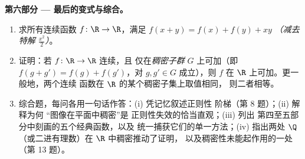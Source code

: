 \begin{problem}[{周末问题 --- $f(x + y) = f(x) + f(y)$：
正则性导出线性，以及“怪物”的画像}]
\medskip
\noindent\textbf{第六部分 --- 最后的变式与综合。}
\begin{enumerate}[resume]
  \item 求所有连续函数 $f \colon \R \to \R$，满足 $f(x + y)
        = f(x) + f(y) + xy$ \emph{（减去特解
        $\frac{x^2}{2}$）}。
  \item 证明：若 $f \colon \R \to \R$ 连续，且
        仅在\emph{稠密子群} $G$ 上可加（即
        $f(g + g') = f(g) + f(g')$，对 $g, g' \in G$ 成立），则 $f$
        在 $\R$ 上可加。更一般地，两个连续
        函数在 $\R$ 的某个稠密子集上取值相同，
        则二者相等。
  \item 综合题，每问各用一句话作答：(i) 凭记忆叙述正则性
        阶梯（第 8 题）；(ii) 解释为何
        “图像在平面中稠密”是
        正则性失效的恰当直观；(iii) 列出
        第四至五部分中刻画的五个经典函数，以及
        统一捕获它们的单一方法；(iv) 指出两处
        $\Q$（或二进有理数）在 $\R$ 中稠密推动了证明，
        以及稠密性未能起作用的一处
        （第 13 题）。
\end{enumerate}
\end{problem}
